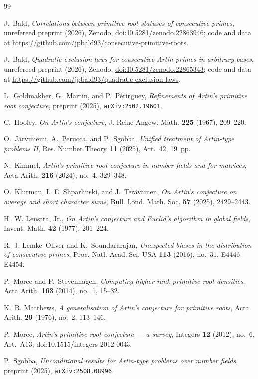 \documentclass[11pt,reqno]{amsart}
\theoremstyle{plain}
\theoremstyle{definition}
\begin{document}
\begin{thebibliography}{99}

J.~Bald,
\emph{Correlations between primitive root statuses of consecutive primes},
unrefereed preprint (2026), Zenodo,
\href{https://doi.org/10.5281/zenodo.22863946}{doi:10.5281/zenodo.22863946};
code and data at
\url{https://github.com/jpbald93/consecutive-primitive-roots}.

 J.~Bald, \emph{Quadratic exclusion laws for consecutive Artin primes in arbitrary bases}, unrefereed preprint (2026), Zenodo, \href{https://doi.org/10.5281/zenodo.22865343}{doi:10.5281/zenodo.22865343}; code and data at \url{https://github.com/jpbald93/quadratic-exclusion-laws}.

L.~Goldmakher, G.~Martin, and P.~P\'eringuey,
\emph{Refinements of Artin's primitive root conjecture},
preprint (2025), \texttt{arXiv:2502.19601}.

C.~Hooley,
\emph{On Artin's conjecture},
J. Reine Angew. Math. \textbf{225} (1967), 209--220.

O.~J\"arviniemi, A.~Perucca, and P.~Sgobba,
\emph{Unified treatment of Artin-type problems II},
Res. Number Theory \textbf{11} (2025), Art.~42, 19~pp.

N.~Kimmel,
\emph{Artin's primitive root conjecture in number fields and for matrices},
Acta Arith. \textbf{216} (2024), no.~4, 329--348.

O.~Klurman, I.~E. Shparlinski, and J.~Ter\"av\"ainen,
\emph{On Artin's conjecture on average and short character sums},
Bull. Lond. Math. Soc. \textbf{57} (2025), 2429--2443.

H.~W. Lenstra, Jr.,
\emph{On Artin's conjecture and Euclid's algorithm in global fields},
Invent. Math. \textbf{42} (1977), 201--224.

R.~J. Lemke~Oliver and K.~Soundararajan,
\emph{Unexpected biases in the distribution of consecutive primes},
Proc. Natl. Acad. Sci. USA \textbf{113} (2016), no.~31, E4446--E4454.

P.~Moree and P.~Stevenhagen,
\emph{Computing higher rank primitive root densities},
Acta Arith. \textbf{163} (2014), no.~1, 15--32.

K.~R. Matthews,
\emph{A generalisation of Artin's conjecture for primitive roots},
Acta Arith. \textbf{29} (1976), no.~2, 113--146.

P.~Moree,
\emph{Artin's primitive root conjecture --- a survey},
Integers \textbf{12} (2012), no.~6, Art.~A13;
doi:10.1515/integers-2012-0043.

P.~Sgobba,
\emph{Unconditional results for Artin-type problems over number fields},
preprint (2025), \texttt{arXiv:2508.08996}.

\end{thebibliography}
\end{document}
